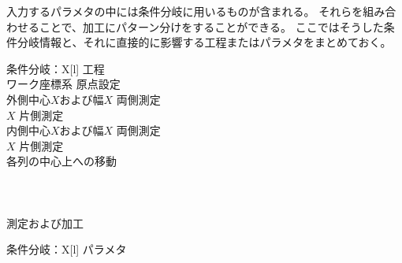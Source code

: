 

入力するパラメタの中には条件分岐に用いるものが含まれる。
それらを組み合わせることで、加工にパターン分けをすることができる。
ここではそうした条件分岐情報と、それに直接的に影響する工程またはパラメタをまとめておく。




\begin{multicollongtblr}{条件分岐：\PMCenterCurvatureExists}{X[l]}
工程\\
ワーク座標系 原点設定\\
外側中心$X$および幅$X$ 両側測定\\
\KeywayCenter$X$ 片側測定\\
内側中心$X$および幅$X$ 両側測定\\
\OutcutCenter$X$ 片側測定\\
\indexDimpleMeasurement\indexDimpleMilling{} 各列の中心上への移動\\
\KeywayMilling\\
\EndFaceOutChamferMilling\\
\EndFaceInChamferMilling\\
\indexReliefGrooveMeasurement\indexReliefGrooveMilling\nameReliefGroove 測定および加工\\
\end{multicollongtblr}

\begin{multicollongtblr}{条件分岐：\PMBottomALBracketDimensionExists}{X[l]}
パラメタ\\
\AlocationLength\\
\end{multicollongtblr}



\clearpage

